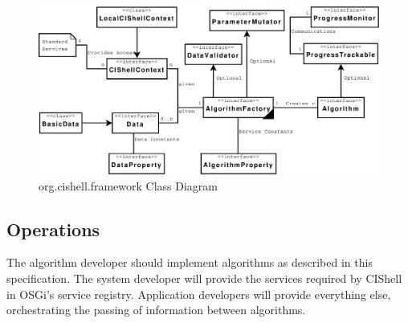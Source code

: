 \begin{figure}[htb!]
\centering
\includegraphics[width=150mm]{../img/cishellInteraction.pdf}
\caption{org.cishell.framework Class Diagram}
\label{fig:cishellInteraction}
\end{figure}

\subsection{Operations}

The algorithm developer should implement algorithms as described in this
specification. The system developer will provide the services required by CIShell
in OSGi's service registry. Application developers will provide everything else,
orchestrating the passing of information between algorithms.
